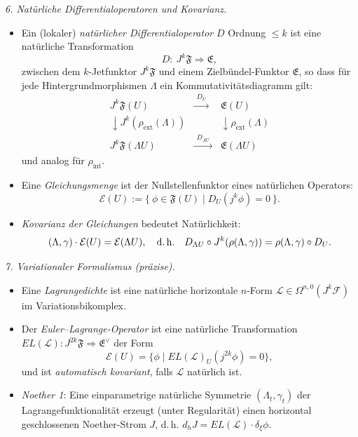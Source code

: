 \documentclass[10pt, letterpaper]{article}
\begin{document}
\bigskip
\emph{6. Natürliche Differentialoperatoren und Kovarianz.}
\begin{itemize}
\item Ein (lokaler) \emph{natürlicher Differentialoperator} $D$ Ordnung $\le k$ ist eine natürliche Transformation
\[
D:\ J^k\mathfrak F \Longrightarrow \mathfrak E,
\]
zwischen dem $k$-Jetfunktor $J^k\mathfrak F$ und einem Zielbündel-Funktor $\mathfrak E$,
so dass für jede Hintergrundmorphismen $\Lambda$ ein Kommutativitätsdiagramm gilt:
\[
\begin{array}{ccc}
J^k\mathfrak F(U) & \xrightarrow{\ \ D_U\ \ } & \mathfrak E(U)\\
\downarrow J^k(\rho_{\mathrm{ext}}(\Lambda)) & & \downarrow \rho_{\mathrm{ext}}(\Lambda) \\
J^k\mathfrak F(\Lambda U) & \xrightarrow{\ \ D_{\Lambda U}\ \ } & \mathfrak E(\Lambda U)
\end{array}
\]
und analog für $\rho_{\mathrm{int}}$.
\item Eine \emph{Gleichungsmenge} ist der Nullstellenfunktor eines natürlichen Operators:
\[
\mathcal E(U):=\{\ \phi\in\mathfrak F(U)\mid D_U(j^k\phi)=0\ \}.
\]
\item \emph{Kovarianz der Gleichungen} bedeutet Natürlichkeit:
\[
(\Lambda,\gamma)\cdot \mathcal E(U)=\mathcal E(\Lambda U),\quad
\text{d.\,h.}\quad
D_{\Lambda U}\circ J^k(\rho(\Lambda,\gamma))=\rho(\Lambda,\gamma)\circ D_U.
\]
\end{itemize}

\bigskip
\emph{7. Variationaler Formalismus (präzise).}
\begin{itemize}
\item Eine \emph{Lagrangedichte} ist eine natürliche horizontale $n$-Form
$\mathcal L\in\Omega^{n,0}(J^k\mathcal F)$ im Variationsbikomplex.
\item Der \emph{Euler–Lagrange-Operator} ist eine natürliche Transformation
$EL(\mathcal L):J^{2k}\mathfrak F\Rightarrow \mathfrak E^\vee$ der Form
\[
\mathcal E(U)=\{\phi\mid EL(\mathcal L)_U(j^{2k}\phi)=0\},
\]
und ist \emph{automatisch kovariant}, falls $\mathcal L$ natürlich ist.
\item \emph{Noether 1}: Eine einparametrige natürliche Symmetrie
$(\Lambda_t,\gamma_t)$ der Lagrangefunktionalität erzeugt (unter Regularität) einen horizontal geschlossenen Noether-Strom $J$, d.\,h.
$d_h J = EL(\mathcal L)\cdot \delta_\xi\phi$.
\end{itemize}
\end{document}
